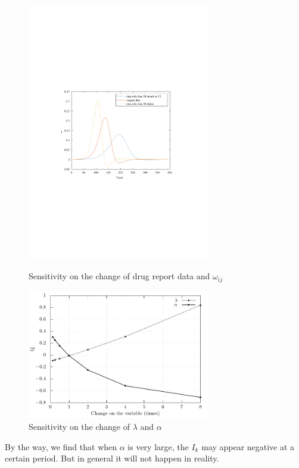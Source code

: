 \documentclass{mcmthesis}
\begin{document}
\begin{figure}[htbp!]
  \begin{flushleft}
  	\begin{minipage}[t]{0.3\textwidth}
  \centering
  \includegraphics[width=8cm]{figures/SensitivityAnalysis1}
  \caption{Sensitivity on the change of drug report data and $\omega_{ij}$}
  \end{minipage}
  \qquad\qquad\qquad\qquad
  	\begin{minipage}[t]{0.3\textwidth}
  \centering
  \includegraphics[width=8cm]{figures/SensitivityAnalysis2}
  \caption{Sensitivity on the change of $\lambda$ and $\alpha$}
  \end{minipage}
  \end{flushleft}
  
\end{figure}

By the way, we find that when $\alpha$ is very large, the $I_k$ may appear negative at a certain period. But in general it will not happen in reality.
\end{document}
